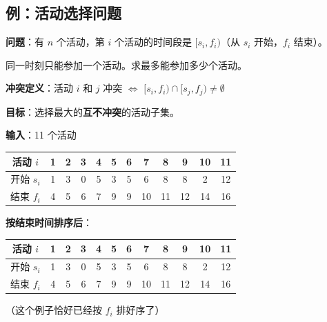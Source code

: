 \documentclass[12pt, a4paper]{ctexart}
\begin{document}
\subsection{例：活动选择问题}

\begin{blackboard}[问题定义]

\textbf{问题}：有 $n$ 个活动，第 $i$ 个活动的时间段是 $[s_i, f_i)$（从 $s_i$ 开始，$f_i$ 结束）。

同一时刻只能参加一个活动。求最多能参加多少个活动。

\textbf{冲突定义}：活动 $i$ 和 $j$ 冲突 $\Leftrightarrow$ $[s_i, f_i) \cap [s_j, f_j) \neq \emptyset$

\textbf{目标}：选择最大的\textbf{互不冲突}的活动子集。

\end{blackboard}

\begin{blackboard}[具体例子]

\textbf{输入}：11 个活动

\begin{center}
\begin{tabular}{c|ccccccccccc}
活动 $i$ & 1 & 2 & 3 & 4 & 5 & 6 & 7 & 8 & 9 & 10 & 11 \\
\hline
开始 $s_i$ & 1 & 3 & 0 & 5 & 3 & 5 & 6 & 8 & 8 & 2 & 12 \\
结束 $f_i$ & 4 & 5 & 6 & 7 & 9 & 9 & 10 & 11 & 12 & 14 & 16 \\
\end{tabular}
\end{center}

\textbf{按结束时间排序后}：

\begin{center}
\begin{tabular}{c|ccccccccccc}
活动 $i$ & 1 & 2 & 3 & 4 & 5 & 6 & 7 & 8 & 9 & 10 & 11 \\
\hline
开始 $s_i$ & 1 & 3 & 0 & 5 & 3 & 5 & 6 & 8 & 8 & 2 & 12 \\
结束 $f_i$ & 4 & 5 & 6 & 7 & 9 & 9 & 10 & 11 & 12 & 14 & 16 \\
\end{tabular}
\end{center}

（这个例子恰好已经按 $f_i$ 排好序了）

\end{blackboard}
\end{document}
